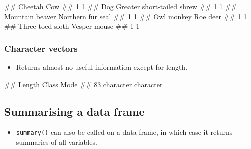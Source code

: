 \documentclass[
]{book}
\newenvironment{Shaded}{\begin{snugshade}}{\end{snugshade}}
\newcommand{\FunctionTok}[1]{\textcolor[rgb]{0.13,0.29,0.53}{\textbf{#1}}}
\newcommand{\NormalTok}[1]{#1}
\newcommand{\SpecialCharTok}[1]{\textcolor[rgb]{0.81,0.36,0.00}{\textbf{#1}}}
\providecommand{\tightlist}{%
  \setlength{\itemsep}{0pt}\setlength{\parskip}{0pt}}
\begin{document}
\begin{Shaded}
\begin{Highlighting}[]
\NormalTok{\#\#                    Cheetah                        Cow }
\NormalTok{\#\#                          1                          1 }
\NormalTok{\#\#                        Dog Greater short{-}tailed shrew }
\NormalTok{\#\#                          1                          1 }
\NormalTok{\#\#            Mountain beaver          Northern fur seal }
\NormalTok{\#\#                          1                          1 }
\NormalTok{\#\#                 Owl monkey                   Roe deer }
\NormalTok{\#\#                          1                          1 }
\NormalTok{\#\#           Three{-}toed sloth               Vesper mouse }
\NormalTok{\#\#                          1                          1}
\end{Highlighting}
\end{Shaded}

\hypertarget{character-vectors}{%
\subsubsection{Character vectors}\label{character-vectors}}

\begin{itemize}
\tightlist
\item
  Returns almost no useful information except for length.
\end{itemize}

\begin{Shaded}
\end{Shaded}

\begin{Shaded}
\begin{Highlighting}[]
\NormalTok{\#\#    Length     Class      Mode }
\NormalTok{\#\#        83 character character}
\end{Highlighting}
\end{Shaded}

\hypertarget{summarising-a-data-frame}{%
\subsection{Summarising a data frame}\label{summarising-a-data-frame}}

\begin{itemize}
\tightlist
\item
  \texttt{summary()} can also be called on a data frame, in which case it returns summaries of all variables.
\end{itemize}
\end{document}
